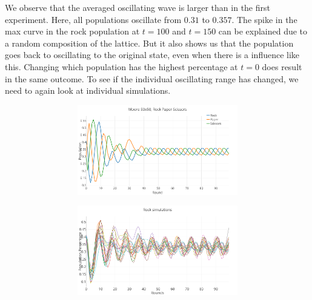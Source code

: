 \documentclass[a4paper, 11pt]{article}
\begin{document}
\begin{landscape}
We observe that the averaged oscillating wave is larger than in the first experiment. Here, all populations oscillate from $0.31$ to $0.357$. The spike in the max curve in the rock population at $t=100$ and $t=150$ can be explained due to a random composition of the lattice. But it also shows us that the population goes back to oscillating to the original state, even when there is a influence like this. Changing which population has the highest percentage at $t=0$ does result in the same outcome. To see if the individual oscillating range has changed, we need to again look at individual simulations.

\end{landscape}


\newpage
\begin{figure}[H]
\begin{subfigure}{.65\textwidth}
	\begin{subfigure}{1\textwidth}
		\includegraphics[width=1\linewidth]{50x50_40RockDist_IndividualGame}
	\end{subfigure}

	\begin{subfigure}{1\textwidth}
		\includegraphics[width=1\linewidth]{50x50_40RockDist_RockGames}
	\end{subfigure}
	

\end{subfigure}
\end{figure}
\end{document}

